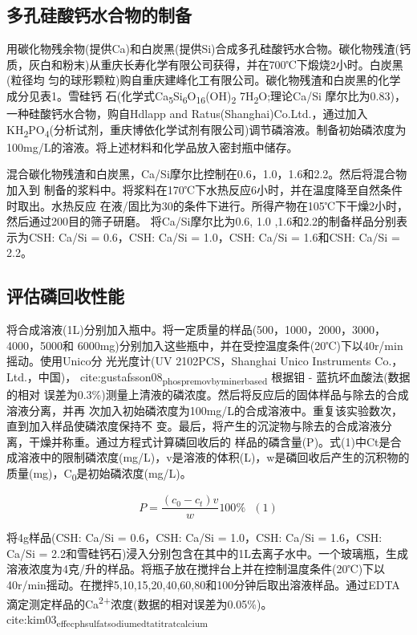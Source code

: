 \documentclass[11pt]{article}
\begin{document}
\subsection{多孔硅酸钙水合物的制备}
\label{sec:org5675872}
用碳化物残余物(提供Ca)和白炭黑(提供Si)合成多孔硅酸钙水合物。碳化物残渣(钙
质，灰白和粉末)从重庆长寿化学有限公司获得，并在700℃下煅烧2小时。白炭黑(粒径均
匀的球形颗粒)购自重庆建峰化工有限公司。碳化物残渣和白炭黑的化学成分见表1。雪硅钙
石(化学式Ca\textsubscript{5}Si\textsubscript{6}O\textsubscript{16}(OH)\textsubscript{2} \dot 7H\textsubscript{2}O;理论Ca/Si 摩尔比为0.83)，一种硅酸钙水合物，购自Hdlapp and Ratus(Shanghai)Co.Ltd.，通过加入KH\textsubscript{2}PO\textsubscript{4}(分析试剂，重庆博依化学试剂有限公司)调节磷溶液。制备初始磷浓度为100mg/L的溶液。将上述材料和化学品放入密封瓶中储存。

混合碳化物残渣和白炭黑，Ca/Si摩尔比控制在0.6，1.0，1.6和2.2。然后将混合物加入到
制备的浆料中。将浆料在170℃下水热反应6小时，并在温度降至自然条件时取出。水热反应
在液/固比为30的条件下进行。所得产物在105℃下干燥2小时，然后通过200目的筛子研磨。
将Ca/Si摩尔比为0.6, 1.0 ,1.6和2.2的制备样品分别表示为CSH: Ca/Si = 0.6，CSH: Ca/Si
= 1.0，CSH: Ca/Si = 1.6和CSH: Ca/Si = 2.2。
\subsection{评估磷回收性能}
\label{sec:org537a8b6}
将合成溶液(1L)分别加入瓶中。将一定质量的样品(500，1000，2000，3000，4000，5000和
6000mg)分别加入这些瓶中，并在受控温度条件(20℃)下以40r/min摇动。使用Unico分
光光度计(UV 2102PCS，Shanghai Unico Instruments Co.，Ltd.，中国)，
cite:gustafsson08\textsubscript{phosp}\textsubscript{remov}\textsubscript{by}\textsubscript{miner}\textsubscript{based} 根据钼 - 蓝抗坏血酸法(数据的相对
误差为0.3\%)测量上清液的磷浓度。然后将反应后的固体样品与除去的合成溶液分离，并再
次加入初始磷浓度为100mg/L的合成溶液中。重复该实验数次，直到加入样品使磷浓度保持不
变。最后，将产生的沉淀物与除去的合成溶液分离，干燥并称重。通过方程式计算磷回收后的
样品的磷含量(P)。式(1)中Ct是合成溶液中的限制磷浓度(mg/L)，v是溶液的体积(L)，w是磷回收后产生的沉积物的质量(mg)，C\textsubscript{0}是初始磷浓度(mg/L)。

\[P = \frac{(c_{0} - c_{t})v}{w} 100\% \ \ \  (1)\]

将4g样品(CSH: Ca/Si = 0.6，CSH: Ca/Si = 1.0，CSH: Ca/Si = 1.6，CSH: Ca/Si = 2.2和雪硅钙石)浸入分别包含在其中的1L去离子水中。一个玻璃瓶，生成溶液浓度为4克/升的样品。将瓶子放在搅拌台上并在控制温度条件(20℃)下以40r/min摇动。在搅拌5,10,15,20,40,60,80和100分钟后取出溶液样品。通过EDTA滴定测定样品的Ca\textsuperscript{2+}浓度(数据的相对误差为0.05\%)。cite:kim03\textsubscript{effec}\textsubscript{ph}\textsubscript{sulfat}\textsubscript{sodium}\textsubscript{edta}\textsubscript{titrat}\textsubscript{calcium}
\end{document}
